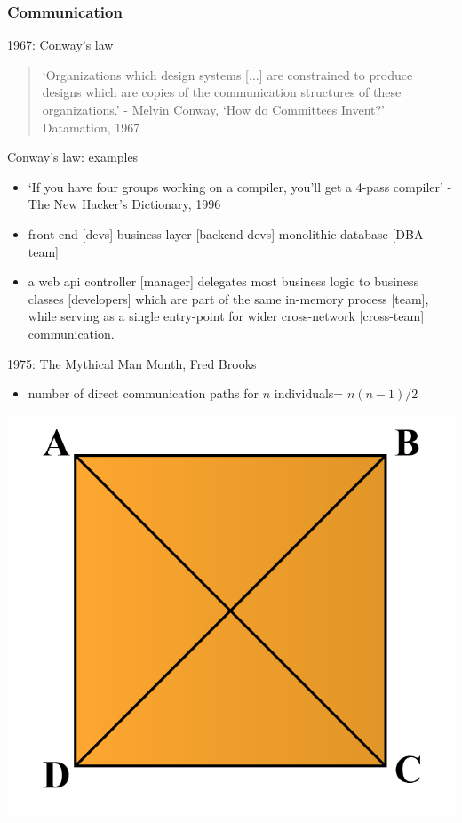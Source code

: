 \documentclass{beamer}
\begin{document}
\subsubsection{Communication}
\begin{frame}{1967: Conway's law}
	\begin{quote}
		`Organizations which design systems [...] are constrained to produce designs which are copies of the communication structures of these organizations.' - Melvin Conway, `How do Committees Invent?' Datamation, 1967
	\end{quote}
\end{frame}
\begin{frame}{Conway's law: examples}
	\begin{itemize}
		\item `If you have four groups working on a compiler, you'll get a 4-pass compiler' - The New Hacker's Dictionary, 1996\pause
		\item front-end [devs] business layer [backend devs] monolithic database [DBA team] \pause
		\item a web api controller [manager]  delegates most business logic to business classes [developers] which are part of the same in-memory process [team], while serving as a single entry-point for wider cross-network [cross-team] communication.
	\end{itemize}
\end{frame}
\begin{frame}{1975: The Mythical Man Month, Fred Brooks}
	
	\begin{itemize}
		\item number of direct communication paths for $n$ individuals= $n(n-1)/2$
	\end{itemize}
	\begin{center}
		\includegraphics[width=.5\textwidth]{square}
	\end{center}
	
\end{frame}
\end{document}
